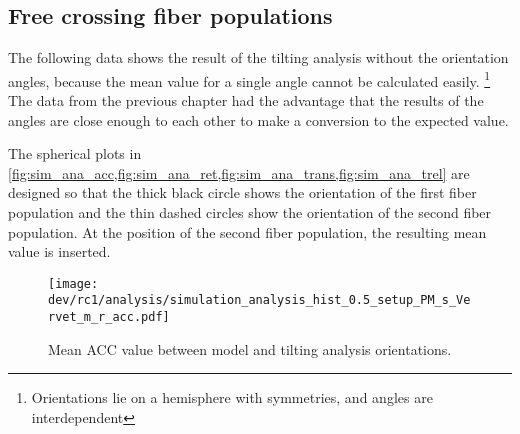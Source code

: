 \subsection{Free crossing fiber populations}
\label{sec:resFreeCross}
%
The following data shows the result of the tilting analysis without the orientation angles, because the mean value for a single angle cannot be calculated easily. \footnote{Orientations lie on a hemisphere with symmetries, and angles are interdependent}
The data from the previous chapter had the advantage that the results of the angles are close enough to each other to make a conversion to the expected value.
\par
%
The spherical plots in \cref{fig:sim_ana_acc,fig:sim_ana_ret,fig:sim_ana_trans,fig:sim_ana_trel} are designed so that the thick black circle shows the orientation of the first fiber population and the thin dashed circles show the orientation of the second fiber population.
At the position of the second fiber population, the resulting mean value is inserted.
%
%
%
\begin{figure}[!p]
\centering
\texttt{[image: dev/rc1/analysis/simulation\_analysis\_hist\_0.5\_setup\_PM\_s\_Vervet\_m\_r\_acc.pdf]}
\caption{Mean \ac{ACC} value between model and tilting analysis orientations. }
\label{fig:sim_ana_acc}
\end{figure}
%
